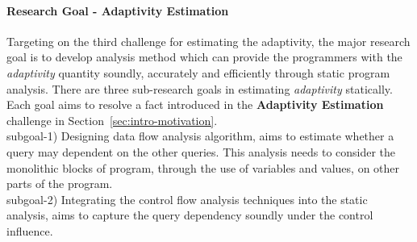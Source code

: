 \paragraph{Research Goal - Adaptivity Estimation}
Targeting on the third challenge
for estimating the adaptivity, 
the major research goal is to develop analysis method which can
provide the programmers with the \emph{adaptivity} quantity
soundly, accurately and
efficiently
through static program analysis.
There are three sub-research goals in estimating \emph{adaptivity} statically.
Each goal aims to resolve a fact introduced in the \textbf{Adaptivity Estimation} challenge in Section~\ref{sec:intro-motivation}.
\\
subgoal-1) Designing data flow analysis algorithm, aims to estimate whether a query may dependent on the other queries. 
This analysis needs to consider the monolithic blocks of program, through the use of variables and values, on other parts of the program.
\\
subgoal-2) Integrating the control flow analysis techniques into the static analysis,
 aims to 
capture the query dependency soundly
under the control influence.
